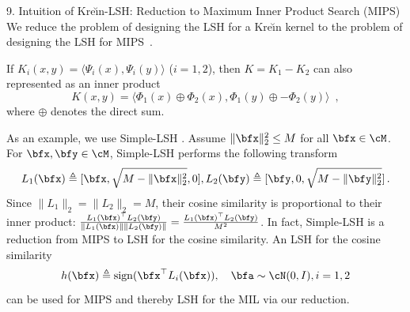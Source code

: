 \documentclass[final]{beamer}
\newcommand{\kr}{Kre\u{\i}n\xspace}
\DeclareMathOperator{\sech}{sech}
\DeclareMathOperator{\sign}{sign}
\newcommand{\ie}{\emph{i.e.}\xspace}
\newcommand{\splsh}{\textsf{Simple-LSH}\xspace}
\newlength{\onecolwid}
\begin{document}
\begin{frame}[t]
\begin{columns}[t]
\begin{column}{\onecolwid}
\begin{block}{9. Intuition of \kr-LSH: Reduction to Maximum Inner Product Search (MIPS)}
 		We reduce the problem of designing the LSH for a \kr kernel to 
 		the problem of designing the LSH for MIPS~\citep{shrivastava2014asymmetric}.
 		
 		
 		 If 
 		$ K_i(x,y)=\langle 
 		\Psi_i(x),\Psi_i(y)\rangle $ ($i=1,2$),
 		then $ K = K_1-K_2 $ can also represented as an inner product 
 		\begin{equation}\label{eq:krein_inner_product}
 		K(x,y)=\langle \Phi_1(x)\oplus \Phi_2(x), \Phi_1(y)\oplus 
 		-\Phi_2(y)\rangle\enspace,
 		\end{equation}
 		where $ \oplus $ denotes the direct sum. 
 		

		As an example,  
		we use \splsh 
		\citep{neyshabur2015symmetric}. 
		Assume $ 
		\|\bfx 
		\|^2_2\le M $
		for all 
		$ 
		\bfx\in \cM $.
		For $ \bfx,\bfy\in \cM $, \splsh performs the following 
		transform \[
		L_1(\bfx) \triangleq{} 
		[\bfx,\sqrt{M-\|\bfx\|^2_2},0], L_2(\bfy) \triangleq{} 
		[\bfy,0,\sqrt{M-\|\bfy\|^2_2}]\,.\]
		Since 
		$\|L_1\|_2 = \|L_2\|_2 = M$,
		their cosine similarity is proportional to their inner product: 
		\textcolor{green}{$ 
		\frac{L_1(\bfx)^\top L_2(\bfy)}{\|L_1(\bfx)\|\| L_2(\bfy)\|} = 
		\frac{L_1(\bfx)^\top L_2(\bfy)}{M^2}$}. 
		In fact, \splsh is a reduction from MIPS to LSH for the cosine 
		similarity. An 
		LSH for the cosine 
		similarity~\citep{charikar2002similarity} \[ 
		h(\bfx)\triangleq \sign(\bfx^\top L_i(\bfx)),\quad \bfa\sim \cN(0, I), 
		i=1,2
		\]
		can be used for MIPS and thereby LSH for the MIL  via our 
		reduction.
		

\end{block}
\end{column}
\end{columns}
\end{frame}
\end{document}
